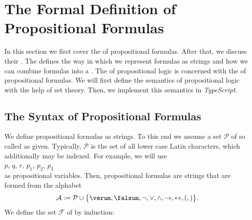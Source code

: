 \section{The Formal Definition of Propositional Formulas}
In this section we first cover the  of propositional formulas.  After that, we discuss their
. The   defines the way in which we represent formulas as strings
and how we can combine formulas into a .  The   of propositional
logic is concerned with the   of propositional formulas.
We will first define the semantics of propositional logic with the help of set theory.
Then, we implement this semantics in \textsl{TypeScript}.

\subsection{The Syntax of Propositional Formulas}
We define propositional formulas as strings.  To this end we assume a set  $\mathcal{P}$  
of so called  as given. 
Typically, $\mathcal{P}$ is the set of all lower case Latin characters, which additionally may be indexed.
For example, we will use 
\\[0.2cm]
\hspace*{1.3cm}
$p$, $q$, $r$, $p_1$, $p_2$, $p_3$
\\[0.2cm]
as propositional variables.  Then, propositional formulas are strings that are formed from the alphabet
$$ 
  \mathcal{A} := \mathcal{P} \cup \bigl\{ \verum, \falsum, \neg, \vee, \wedge,
   \rightarrow, \leftrightarrow, (, ) \bigr\}.
$$
We define the set $\mathcal{F}$ of 
by induction:
